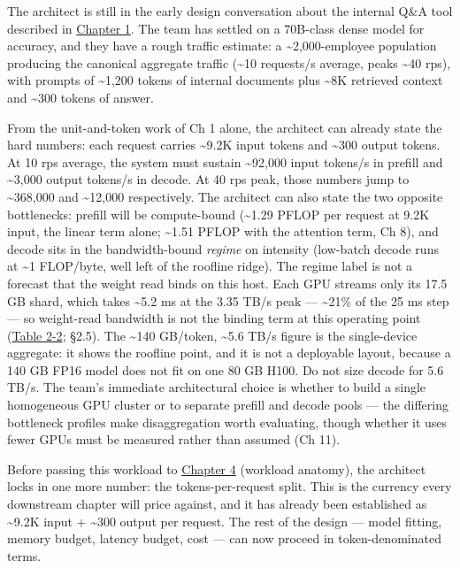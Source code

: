 The architect is still in the early design conversation about the
internal Q\&A tool described in \hyperref[chap:1]{Chapter 1}. The team has settled on a
70B-class dense model for accuracy, and they have a rough traffic
estimate: a \textasciitilde2,000-employee population producing the
canonical aggregate traffic (\textasciitilde10 requests/s average, peaks
\textasciitilde40 rps), with prompts of \textasciitilde1,200 tokens of
internal documents plus \textasciitilde8K retrieved context and
\textasciitilde300 tokens of answer.

From the unit-and-token work of Ch 1 alone, the architect can already
state the hard numbers: each request carries \textasciitilde9.2K input
tokens and \textasciitilde300 output tokens. At 10 rps average, the
system must sustain \textasciitilde92,000 input tokens/s in prefill and
\textasciitilde3,000 output tokens/s in decode. At 40 rps peak, those
numbers jump to \textasciitilde368,000 and \textasciitilde12,000
respectively. The architect can also state the two opposite bottlenecks:
prefill will be compute-bound (\textasciitilde1.29 PFLOP per request at
9.2K input, the linear term alone; \textasciitilde1.51 PFLOP with the
attention term, Ch 8), and decode sits in the bandwidth-bound
\emph{regime} on intensity (low-batch decode runs at \textasciitilde1
FLOP/byte, well left of the roofline ridge). The regime label is not a
forecast that the weight read binds on this host. Each GPU streams only
its 17.5 GB shard, which takes \textasciitilde5.2 ms at the 3.35 TB/s
peak --- \textasciitilde21\% of the 25 ms step --- so weight-read
bandwidth is not the binding term at this operating point (\hyperref[tab:2.2]{Table 2-2};
§2.5). The \textasciitilde140 GB/token, \textasciitilde5.6 TB/s figure
is the single-device aggregate: it shows the roofline point, and it is
not a deployable layout, because a 140 GB FP16 model does not fit on one
80 GB H100. Do not size decode for 5.6 TB/s. The team's immediate
architectural choice is whether to build a single homogeneous GPU
cluster or to separate prefill and decode pools --- the differing
bottleneck profiles make disaggregation worth evaluating, though whether
it uses fewer GPUs must be measured rather than assumed (Ch 11).

Before passing this workload to \hyperref[chap:4]{Chapter 4} (workload anatomy), the
architect locks in one more number: the tokens-per-request split. This
is the currency every downstream chapter will price against, and it has
already been established as \textasciitilde9.2K input +
\textasciitilde300 output per request. The rest of the design --- model
fitting, memory budget, latency budget, cost --- can now proceed in
token-denominated terms.
